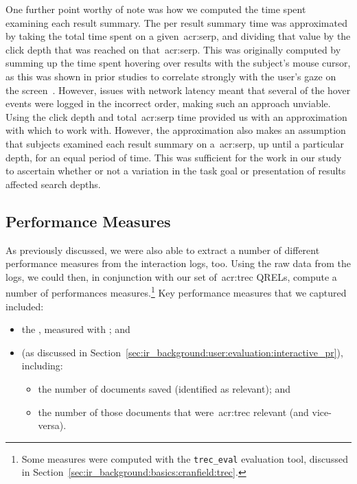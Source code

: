 One further point worthy of note was how we computed the time spent examining each result summary. The per result summary time was approximated by taking the total time spent on a given~\gls{acr:serp}, and dividing that value by the click depth that was reached on that~\gls{acr:serp}. This was originally computed by summing up the time spent hovering over results with the subject's mouse cursor, as this was shown in prior studies to correlate strongly with the user's gaze on the screen~\citep{chen2001mouse_cursor, smucker2014judging_relevance_movements}. However, issues with network latency meant that several of the hover events were logged in the incorrect order, making such an approach unviable. Using the click depth and total~\gls{acr:serp} time provided us with an approximation with which to work with. However, the approximation also makes an assumption that subjects examined each result summary on a~\gls{acr:serp}, up until a particular depth, for an equal period of time. This was sufficient for the work in our study to ascertain whether or not a variation in the task goal or presentation of results affected search depths.

\subsection{Performance Measures}\label{sec:csm:methodology:extracting:performance}
As previously discussed, we were also able to extract a number of different performance measures from the interaction logs, too. Using the raw data from the logs, we could then, in conjunction with our set of~\gls{acr:trec} QRELs, compute a number of performances measures.\footnote{Some measures were computed with the \texttt{trec\_eval} evaluation tool, discussed in Section~\ref{sec:ir_background:basics:cranfield:trec}.} Key performance measures that we captured included:

\begin{itemize}
    \item{the , measured with ; and}
    \item{ (as discussed in Section~\ref{sec:ir_background:user:evaluation:interactive_pr}), including:}
    
    \begin{itemize}
        \item{the number of documents saved (identified as relevant); and}
        \item{the number of those documents that were~\gls{acr:trec} relevant (and vice-versa).}
    \end{itemize}
\end{itemize}

